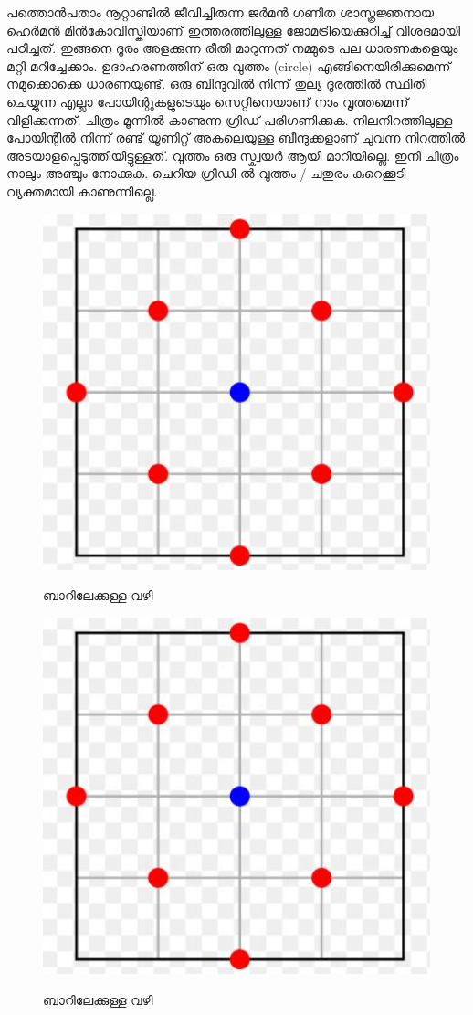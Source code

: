 \documentclass[10pt,a4paper]{report}
\begin{document}
      പത്തൊൻപതാം നൂറ്റാണ്ടിൽ ജീവിച്ചിരുന്ന ജർമൻ ഗണിത ശാസ്ത്രജ്ഞനായ ഹെർമൻ മിൻകോവിസ്കിയാണ് ഇത്തരത്തിലുള്ള ജോമട്രിയെക്കുറിച്ച് വിശദമായി പഠിച്ചത്.   ഇങ്ങനെ  ദൂരം അളക്കുന്ന രീതി മാറുന്നത്    നമ്മുടെ പല ധാരണകളെയും മറ്റി മറിച്ചേക്കാം. ഉദാഹരണത്തിന് ഒരു വുത്തം (circle) എങ്ങിനെയിരിക്കുമെന്ന് നമുക്കൊക്കെ ധാരണയുണ്ട്. ഒരു ബിന്ദുവിൽ നിന്ന് തുല്യ ദൂരത്തിൽ സ്ഥിതി ചെയ്യുന്ന എല്ലാ പോയിന്റുകളുടെയും സെറ്റിനെയാണ് നാം വൃത്തമെന്ന് വിളിക്കുന്നത്. ചിത്രം മൂന്നിൽ കാണുന്ന ഗ്രിഡ് പരിഗണിക്കുക. നിലനിറത്തിലുള്ള പോയിന്റിൽ നിന്ന് രണ്ട് യൂണിറ്റ് അകലെയുള്ള ബീന്ദുക്കളാണ് ചുവന്ന നിറത്തിൽ അടയാളപ്പെടുത്തിയിട്ടുള്ളത്.  വുത്തം ഒരു സ്ക്വയർ ആയി മാറിയില്ലെ. ഇനി ചിത്രം നാലും അഞ്ചും നോക്കുക. ചെറിയ ഗ്രിഡി ൽ വുത്തം / ചതുരം കുറെക്കൂടി വ്യക്തമായി കാണുന്നില്ലെ.

 \begin{figure}[H]
  \center
\includegraphics[scale=.25]{images/bar3}
\label{bar3}
\caption{   ബാറിലേക്കുള്ള വഴി }
\end{figure}

 \begin{figure}[H]
  \center
\includegraphics[scale=.25]{images/bar4}
\label{bar4}
\caption{   ബാറിലേക്കുള്ള വഴി }
\end{figure}
\end{document}
